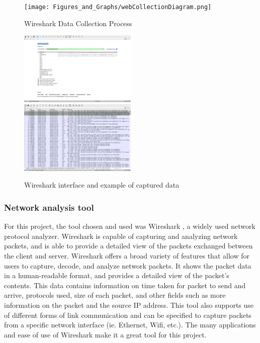 \documentclass[10pt,sigconf,letterpaper,nonacm]{acmart}
\begin{document}
\begin{figure}[t]
  \centering
  \texttt{[image: Figures\_and\_Graphs/webCollectionDiagram.png]}
  \caption{Wireshark Data Collection Process}
  \label{fig:dataCollection}
\end{figure}
\begin{figure}[t]
  \centering
  \includegraphics[width=0.5\textwidth]{Figures_and_Graphs/wiresharkFigure.png}
  \includegraphics[width=0.5\textwidth]{Figures_and_Graphs/wiresharkDataFigure.png}
  \caption{Wireshark interface and example of captured data}
  \label{fig:wireshark}
\end{figure}
\subsubsection{Network analysis tool} For this project, the tool chosen and used was Wireshark \cite{Wireshark}, a widely used network protocol analyzer. Wireshark is capable of capturing and analyzing network packets, and is able to provide a detailed
 view of the packets exchanged between the client and server. Wireshark offers a broad variety of features that allow for users to capture, decode, and analyze network packets. It shows the packet data in a human-readable format, and provides a detailed view of the packet's contents.
 This data contains information on time taken for packet to send and arrive, protocols used, size of each packet, and other fields such as more information on the packet and the source IP address. This tool also supports use of different forms of link communication and can be specified to capture packets from a specific network interface (ie. Ethernet, Wifi, etc.). 
 The many applications and ease of use of Wireshark make it a great tool for this project.
 
\end{document}
